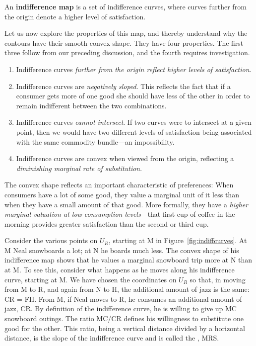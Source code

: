 \begin{DefBox}
An \textbf{indifference map} is a set of indifference curves, where curves further from the origin denote a higher level of satisfaction.
\end{DefBox}

Let us now explore the properties of this map, and thereby understand why the contours have their smooth convex shape. They have four properties. The first three follow from our preceding discussion, and the fourth requires investigation.

\begin{enumerate}
\item  Indifference curves \textit{further from the origin reflect higher levels of satisfaction}.

\item  Indifference curves are \textit{negatively sloped}. This reflects the fact that if a consumer gets more of one good she should have less of the other in order to remain indifferent between the two combinations.

\item  Indifference curves \textit{cannot intersect}. If two curves were to intersect at a given point, then we would have two different levels of satisfaction being associated with the same commodity bundle---an impossibility.

\item  Indifference curves are convex when viewed from the origin, reflecting a \textit{diminishing marginal rate of substitution}.
\end{enumerate}

The convex shape reflects an important characteristic of preferences: When consumers have a lot of some good, they value a marginal unit of it less than when they have a small amount of that good. More formally, they have a \textit{higher marginal valuation at low consumption levels}---that first cup of coffee in the morning provides greater satisfaction than the second or third cup.

Consider the various points on $U_R$, starting at M in Figure~\ref{fig:indiffcurves}. At M Neal snowboards a lot; at N he boards much less. The convex shape of his indifference map shows that he values a marginal snowboard trip more at N than at M. To see this, consider what happens as he moves along his indifference curve, starting at M. We have chosen the coordinates on $U_R$ so that, in moving from M to R, and again from N to H, the additional amount of jazz is the same: CR = FH. From M, if Neal moves to R, he consumes an additional amount of jazz, CR. By definition of the indifference curve, he is willing to give up MC snowboard outings. The ratio MC/CR defines his willingness to substitute one good for the other. This ratio, being a vertical distance divided by a horizontal distance, is the slope of the indifference curve and is called the , MRS.


